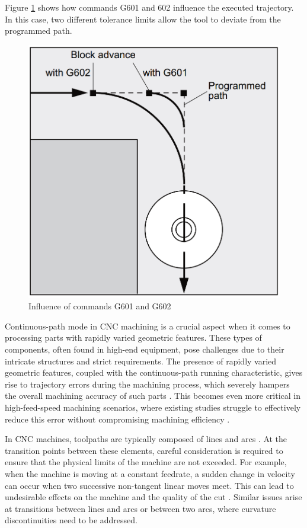 Figure \ref{C4} shows how commands G601 and 602 influence the executed trajectory. In this case, two different tolerance limits allow the tool to deviate from the programmed path.
 
\begin{figure}[H]
 	\centerline{\includegraphics[scale=.25]{figures/conti3.png}}
 	\caption{Influence of commands G601 and G602 \cite{sinumericmanual}}
 	\label{C4}
\end{figure}
 
 
 
Continuous-path mode in CNC machining is a crucial aspect when it comes to processing parts with rapidly varied geometric features. These types of components, often found in high-end equipment, pose challenges due to their intricate structures and strict requirements. The presence of rapidly varied geometric features, coupled with the continuous-path running characteristic, gives rise to trajectory errors during the machining process, which severely hampers the overall machining accuracy of such parts \cite{Shahzadeh.2018}. This becomes even more critical in high-feed-speed machining scenarios, where existing studies struggle to effectively reduce this error without compromising machining efficiency \cite{Li.2018}.

In CNC machines, toolpaths are typically composed of lines and arcs \cite{Liu.2020}. At the transition points between these elements, careful consideration is required to ensure that the physical limits of the machine are not exceeded. For example, when the machine is moving at a constant feedrate, a sudden change in velocity can occur when two successive non-tangent linear moves meet. This can lead to undesirable effects on the machine and the quality of the cut \cite{Boujelbene.2004}. Similar issues arise at transitions between lines and arcs or between two arcs, where curvature discontinuities need to be addressed. 

